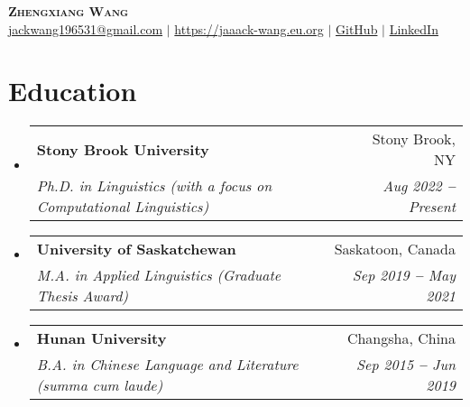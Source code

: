 \documentclass[letterpaper,11pt]{article}
\makeatletter
\newcommand{\resumeSubheading}[4]{
  \vspace{-2pt}\item
    \begin{tabular*}{0.97\textwidth}[t]{l@{\extracolsep{\fill}}r}
      \textbf{#1} & #2 \\
      \textit{\small#3} & \textit{\small #4} \\
    \end{tabular*}\vspace{-7pt}
}
\newcommand{\resumeSubHeadingListStart}{\begin{itemize}[leftmargin=0.15in, label={}]}
\newcommand{\resumeSubHeadingListEnd}{\end{itemize}}
\makeatother
\begin{document}

\begin{center}
    \textbf{\Huge \scshape Zhengxiang Wang} \\ \vspace{3pt}
    \small
    \faEnvelope \hspace{.5pt} \href{mailto:jackwang196531@gmail.com}{jackwang196531@gmail.com}
    $|$
    \faHome \hspace{.5pt} \href{https://jaaack-wang.eu.org}{https://jaaack-wang.eu.org}
    $|$
    \faGithub \hspace{.5pt} \href{https://github.com/jaaack-wang}{GitHub}
    $|$
    \faLinkedinSquare \hspace{.5pt} \href{https://www.linkedin.com/in/zhengxiang-wang-560735191/}{LinkedIn}
    
\end{center}



\section{Education}
  \resumeSubHeadingListStart
    
    \resumeSubheading
      {Stony Brook University}{Stony Brook, NY}
      {Ph.D. in Linguistics \textnormal{(with a focus on Computational Linguistics)}}{Aug 2022 \textbf{--} Present}

    \vspace{3pt}
    \resumeSubheading
      {University of Saskatchewan}{Saskatoon, Canada}
      {M.A. in Applied Linguistics \textnormal{(Graduate Thesis Award)}}{Sep 2019 \textbf{--} May 2021}
      
    \vspace{3pt}
    \resumeSubheading
      {Hunan University}{Changsha, China}
      {B.A. in Chinese Language and Literature \textnormal{(summa cum laude)}}{Sep 2015 \textbf{--} Jun 2019}
    
  \resumeSubHeadingListEnd


\end{document}
